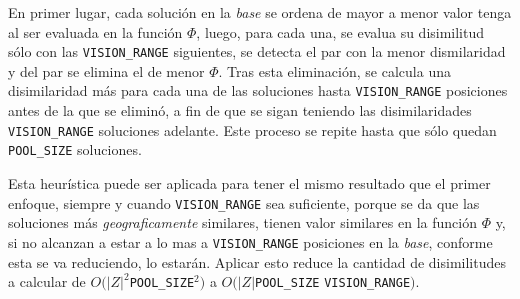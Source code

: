 En primer lugar, cada solución en la \emph{base} se ordena de mayor a menor valor tenga al ser evaluada en la función $\Phi$, luego, para cada una, se evalua su disimilitud sólo con las \texttt{VISION\_RANGE} siguientes, se detecta el par con la menor dismilaridad y del par se elimina el de menor $\Phi$. Tras esta eliminación, se calcula una disimilaridad más para cada una de las soluciones hasta \texttt{VISION\_RANGE} posiciones antes de la que se eliminó, a fin de que se sigan teniendo las disimilaridades \texttt{VISION\_RANGE} soluciones adelante. Este proceso se repite hasta que sólo quedan \texttt{POOL\_SIZE} soluciones.

Esta heurística puede ser aplicada para tener el mismo resultado que el primer enfoque, siempre y cuando \texttt{VISION\_RANGE} sea suficiente, porque se da que las soluciones más \emph{geograficamente} similares, tienen valor similares en la función $\Phi$ y, si no alcanzan a estar a lo mas a \texttt{VISION\_RANGE} posiciones en la \emph{base}, conforme esta se va reduciendo, lo estarán. Aplicar esto reduce la cantidad de disimilitudes a calcular de $O(|Z|^2$\texttt{POOL\_SIZE}$^2)$ a $O(|Z|$\texttt{POOL\_SIZE} \texttt{VISION\_RANGE}$)$.


